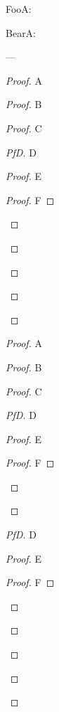 \documentclass{article}
\begin{document}
    \tiny
    \tt

    FooA:\FooA

    BearA:\BearA

        \makeatother

     \BeeBO
        \makeatletter

    ---

    \begin{proof}
        A
        \begin{proof}
            B
            \begin{proof}
                C
                \begin{proof}[PfD]
                    D
                    \begin{proof}
                        E
                        \begin{proof}
                            F
                        \end{proof}
                    \end{proof}
                \end{proof}
            \end{proof}
        \end{proof}
    \end{proof}
    \begin{proof}
        A
        \begin{proof}
            B
            \begin{proof}
                C
                \begin{proof}[PfD]
                    D
                    \begin{proof}
                        E
                        \begin{proof}
                            F
                        \end{proof}
                    \end{proof}
                \end{proof}
                \begin{proof}[PfD]
                    D
                    \begin{proof}
                        E
                        \begin{proof}
                            F
                        \end{proof}
                    \end{proof}
                \end{proof}
            \end{proof}
        \end{proof}
    \end{proof}
\end{document}
